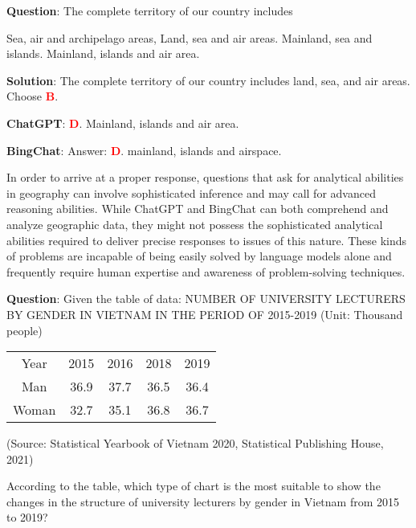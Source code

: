 \documentclass{article}
\begin{document}
{	
	\begin{mdframed}[linewidth=1pt,linecolor=red] \textbf{Question}: The complete territory of our country includes
		
		
		
		\begin{choices}
			\choice Sea, air and archipelago areas,
			\choice Land, sea and air areas.
			\choice Mainland, sea and islands.
			\choice Mainland, islands and air area.
		\end{choices}
		
		\textbf{Solution}: The complete territory of our country includes land, sea, and air areas.
		Choose \textcolor{red}{\textbf{B}}.
		
		\textbf{ChatGPT}: \textcolor{red}{\textbf{D}}. Mainland, islands and air area.
		
		\textbf{BingChat}: Answer: \textcolor{red}{\textbf{D}}. mainland, islands and airspace.
		
	\end{mdframed}	
	
	In order to arrive at a proper response, questions that ask for analytical abilities in geography can involve sophisticated inference and may call for advanced reasoning abilities. While ChatGPT and BingChat can both comprehend and analyze geographic data, they might not possess the sophisticated analytical abilities required to deliver precise responses to issues of this nature. These kinds of problems are incapable of being easily solved by language models alone and frequently require human expertise and awareness of problem-solving techniques.
	
	
	\begin{mdframed}[linewidth=1pt,linecolor=red] \textbf{Question}: Given the table of data: NUMBER OF UNIVERSITY LECTURERS BY GENDER IN VIETNAM IN THE PERIOD OF 2015-2019
		(Unit: Thousand people)
		
		
		
		\begin{tabular}{ccccc}
			\multicolumn{1}{c}{Year} & 2015  & 2016  & 2018  & 2019   \\
			Man   & 36.9 & 37.7 & 36.5 & 36.4  \\
			Woman & 32.7 & 35.1 & 36.8 & 36.7  
		\end{tabular}
		
		(Source: Statistical Yearbook of Vietnam 2020, Statistical Publishing House, 2021)
		
		According to the table, which type of chart is the most suitable to show the changes in the structure of university lecturers by gender in Vietnam from 2015 to 2019?
		

\end{mdframed}}
\end{document}
